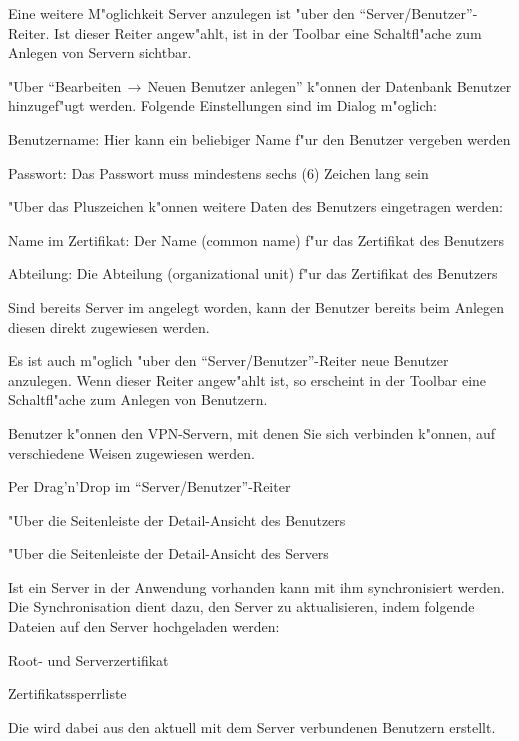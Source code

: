 \nl Eine weitere M"oglichkeit Server anzulegen ist "uber den ``Server/Benutzer''-Reiter.
Ist dieser Reiter angew"ahlt, ist in der Toolbar eine Schaltfl"ache zum Anlegen von Servern
sichtbar.



\nl "Uber ``Bearbeiten$\,\rightarrow\,$Neuen Benutzer anlegen'' k"onnen der
Datenbank Benutzer hinzugef"ugt werden. Folgende Einstellungen sind im
Dialog m"oglich:
\begin{items}

	\item Benutzername: Hier kann ein beliebiger Name f"ur den Benutzer vergeben werden
	\item Passwort: Das Passwort muss mindestens sechs (6) Zeichen lang sein
\end{items}

\nl "Uber das Pluszeichen k"onnen weitere Daten des Benutzers eingetragen werden:
\begin{items}
	\item Name im Zertifikat: Der Name (common name) f"ur das Zertifikat des Benutzers
	\item Abteilung: Die Abteilung (organizational unit) f"ur das Zertifikat des Benutzers
\end{items}

\nl Sind bereits Server im \Nbm{} angelegt worden, kann der Benutzer
bereits beim Anlegen diesen direkt zugewiesen werden.

\nl Es ist auch m"oglich "uber den ``Server/Benutzer''-Reiter neue Benutzer
anzulegen. Wenn dieser Reiter angew"ahlt ist, so erscheint in der Toolbar
eine Schaltfl"ache zum Anlegen von Benutzern.


\nl Benutzer k"onnen den VPN-Servern, mit denen Sie sich verbinden k"onnen, auf
verschiedene Weisen zugewiesen werden.

\begin{items}
	\item Per Drag'n'Drop im ``Server/Benutzer''-Reiter
	\item "Uber die Seitenleiste der Detail-Ansicht des Benutzers
	\item "Uber die Seitenleiste der Detail-Ansicht des Servers
\end{items}



\nl Ist ein Server in der Anwendung vorhanden kann mit ihm synchronisiert werden.
Die Synchronisation dient dazu, den Server zu aktualisieren, indem folgende Dateien
auf den Server hochgeladen werden:
\begin{items}
\item Root- und Serverzertifikat
\item Zertifikatssperrliste
\item \Npwf{}
\end{items}
Die  \Npwf{} wird dabei aus den aktuell mit dem Server verbundenen
Benutzern erstellt.

